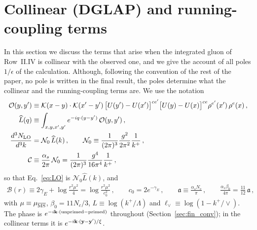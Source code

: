 \section{Collinear (DGLAP) and running-coupling terms}\label{sec:dglap_rc}


In this section we discuss the terms that arise when the integrated gluon of Row~II.IV is collinear with the observed one, and we give the account of all poles $1/\epsilon$ of the calculation. Although, following the convention of the rest of the paper, no pole is written in the final result, the poles determine what the collinear and the running-coupling terms are. We use the notation
\begin{align}\label{eq:dg_not}
\mathcal O(y,y')&\equiv\mathcal{K}(x-y)\cdot\mathcal{K}(x'-y')\,\big[U(y')-U(x')\big]^{ce'}\big[U(y)-U(x)\big]^{ce}\rho^{e'}(x')\,\rho^{e}(x)\,,\notag\\
\widehat L(q)&\equiv\int_{x,y,x',y'}e^{-iq\cdot(y-y')}\,\mathcal O(y,y')\,,\notag\\
\frac{d^3N_{\rm LO}}{d^3k}&=\mathcal N_0\,\widehat L(k)\,,\qquad
\mathcal N_0\equiv\frac{1}{(2\pi)^3}\frac{g^2}{2\pi^2}\frac{1}{k^+}\,,\notag\\
\mathcal C&\equiv\frac{\alpha_s}{2\pi}\,\mathcal N_0=\frac{1}{(2\pi)^3}\frac{g^4}{16\pi^4}\frac{1}{k^+}\,,
\end{align}
so that Eq.~\eqref{eq:LO} is $\mathcal N_0\widehat L(k)$, and
\begin{align}\label{eq:dg_B}
\mathcal B(r)\equiv2\gamma_E+\log\frac{r^2\mu^2}{4}=\log\frac{r^2\mu^2}{c_0^2}\,,\qquad c_0=2e^{-\gamma_E}\,,\qquad
\mathfrak a\equiv\frac{\alpha_sN_c}{\pi}\,,\qquad \frac{\alpha_s\beta_0}{4\pi}=\frac{11}{12}\,\mathfrak a\,,
\end{align}
with $\mu\equiv\mu_{\overline{\rm MS}}$, $\beta_0=11N_c/3$, $L\equiv\log(k^+/\Lambda)$ and $\ell_\vee\equiv\log(1-k^+/\vee)$. The phase is $e^{-i\mathbf{k}\cdot(\text{unprimed}-\text{primed})}$ throughout (Section~\ref{sec:fin_conv}); in the collinear terms it is $e^{-i\mathbf{k}\cdot(\mathbf{y}-\mathbf{y}')/\xi}$.


